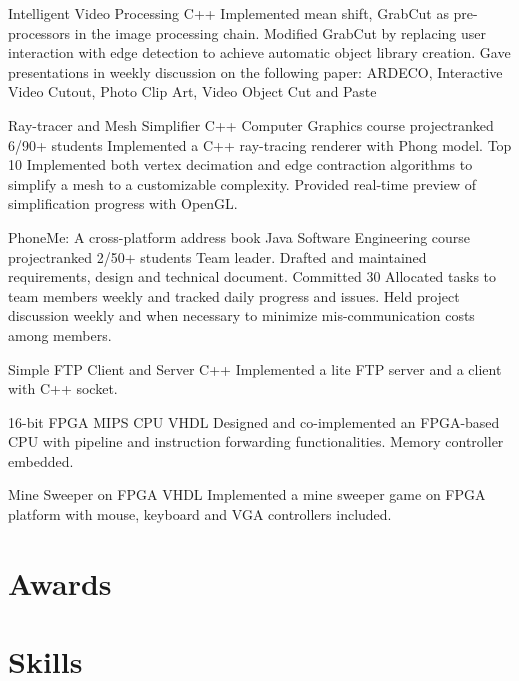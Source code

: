 \documentclass[11pt,a4paper]{moderncv/moderncv}
\begin{document}
{Intelligent Video Processing}
{C++}
{}{}
{
Implemented mean shift, GrabCut as pre-processors in the image processing chain.
Modified GrabCut by replacing user interaction with edge detection to achieve automatic object library creation.
Gave presentations in weekly discussion on the following paper: ARDECO, Interactive Video Cutout, Photo Clip Art, Video Object Cut and Paste
}

{Ray-tracer and Mesh Simplifier}
{C++}
{Computer Graphics course project}{ranked 6/90+ students}
{
Implemented a C++ ray-tracing renderer with Phong model.
Top 10%
Implemented both vertex decimation and edge contraction algorithms to simplify a mesh to a customizable complexity.
Provided real-time preview of simplification progress with OpenGL.
}

{PhoneMe: A cross-platform address book}
{Java}
{Software Engineering course project}{ranked 2/50+ students}
{
Team leader.
Drafted and maintained requirements, design and technical document.
Committed 30%
Allocated tasks to team members weekly and tracked daily progress and issues.
Held project discussion weekly and when necessary to minimize mis-communication
costs among members.
}

{Simple FTP Client and Server}
{C++}
{}{}
{
Implemented a lite FTP server and a client with C++ socket.
}

{16-bit FPGA MIPS CPU}
{VHDL}
{}{}
{
Designed and co-implemented an FPGA-based CPU with pipeline and instruction forwarding functionalities. Memory controller embedded.
}

{Mine Sweeper on FPGA}
{VHDL}
{}{}
{
Implemented a mine sweeper game on FPGA platform with mouse, keyboard and VGA controllers included.
}



\nocite{*}


\section{Awards}


\section{Skills}
\end{document}
